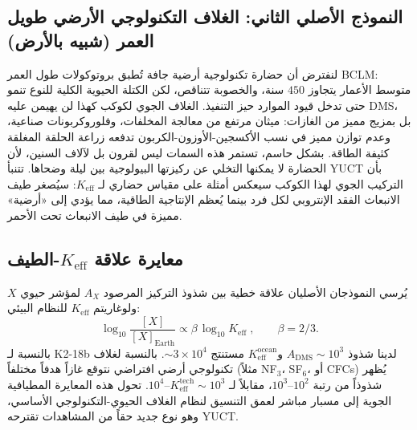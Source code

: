 \documentclass[11pt,a4paper]{article}
\begin{document}
	\subsection{النموذج الأصلي الثاني: الغلاف التكنولوجي الأرضي طويل العمر (شبيه بالأرض)}
	لنفترض أن حضارة تكنولوجية أرضية جافة تُطبق بروتوكولات طول العمر BCLM: متوسط الأعمار يتجاوز \(450\) سنة، والخصوبة تتناقص، لكن الكتلة الحيوية الكلية للنوع تنمو حتى تدخل قيود الموارد حيز التنفيذ. الغلاف الجوي لكوكب كهذا لن يهيمن عليه DMS، بل بمزيج مميز من الغازات: ميثان مرتفع من معالجة المخلفات، وفلوروكربونات صناعية، وعدم توازن مميز في نسب الأكسجين-الأوزون-الكربون تدفعه زراعة الحلقة المغلقة كثيفة الطاقة. بشكل حاسم، تستمر هذه السمات ليس لقرون بل لآلاف السنين، لأن الحضارة لا يمكنها التخلي عن ركيزتها البيولوجية بين ليلة وضحاها. تتنبأ YUCT بأن التركيب الجوي لهذا الكوكب سيعكس أمثلة على مقياس حضاري لـ \(K_{\mathrm{eff}}\): سيُصغر طيف الانبعاث الفقد الإنتروبي لكل فرد بينما يُعظم الإنتاجية الطاقية، مما يؤدي إلى «أرضية» مميزة في طيف الانبعاث تحت الأحمر.
	
	\subsection{معايرة علاقة \(K_{\mathrm{eff}}\)-الطيف}
	يُرسي النموذجان الأصليان علاقة خطية بين شذوذ التركيز المرصود \(A_X\) لمؤشر حيوي \(X\) ولوغاريتم \(K_{\mathrm{eff}}\) للنظام البيئي:
	\begin{equation}
		\log_{10} \frac{[X]}{[X]_{\mathrm{Earth}}} \propto
		\beta\,\log_{10} K_{\mathrm{eff}} \; , \qquad \beta = 2/3 .
	\end{equation}
	بالنسبة لـ K2-18b لدينا شذوذ \(A_{\mathrm{DMS}} \sim 10^3\) و\(K_{\mathrm{eff}}^{\mathrm{ocean}}\) مستنتج \(\sim 3\times10^4\). بالنسبة لغلاف تكنولوجي أرضي افتراضي نتوقع غازاً هدفاً مختلفاً (مثلاً NF$_3$، SF$_6$، أو CFCs) يُظهر شذوذاً من رتبة \(10^2\)--\(10^3\)، مقابلاً لـ \(K_{\mathrm{eff}}^{\mathrm{tech}} \sim 10^3\)--\(10^4\). تحول هذه المعايرة المطيافية الجوية إلى مسبار مباشر لعمق التنسيق لنظام الغلاف الحيوي-التكنولوجي الأساسي، وهو نوع جديد حقاً من المشاهدات تقترحه YUCT.
	
\end{document}
